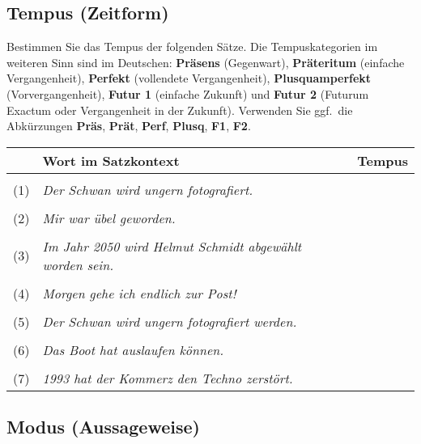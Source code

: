 \documentclass[12pt,a4paper,twoside]{article}
\newcommand{\gruen}[1]{\textcolor{gruen}{#1}}
\newcommand{\morphologieaufgabe}{}
\newcommand{\morphologieaufgabe}{\textbf{\gruen{Morphologie-Seminar}}\ |\ }
\begin{document}
\begin{ignorable}

\subsection{\morphologieaufgabe Tempus (Zeitform)}

Bestimmen Sie das Tempus der folgenden Sätze.
Die Tempuskategorien im weiteren Sinn sind im Deutschen: \textbf{Präsens} (Gegenwart), \textbf{Präteritum} (einfache Vergangenheit), \textbf{Perfekt} (vollendete Vergangenheit), \textbf{Plusquamperfekt} (Vorvergangenheit), \textbf{Futur 1} (einfache Zukunft) und \textbf{Futur 2} (Futurum Exactum oder Vergangenheit in der Zukunft).
Verwenden Sie ggf.\ die Abkürzungen \textbf{Präs}, \textbf{Prät}, \textbf{Perf}, \textbf{Plusq}, \textbf{F1}, \textbf{F2}.

\begin{center}
  \begin{tabular}[h]{clp{}}
    \toprule
    & \textbf{Wort im Satzkontext} & \textbf{Tempus} \\
    \midrule
    && \\
    (1) & \textit{Der Schwan wird ungern fotografiert.}                     &  \\ \cline{3-3}
    && \\
    (2) & \textit{Mir war übel geworden.}                                   &  \\ \cline{3-3}
    && \\
    (3) & \textit{Im  Jahr 2050 wird Helmut Schmidt abgewählt worden sein.} &  \\ \cline{3-3}
    && \\
    (4) & \textit{Morgen gehe ich endlich zur Post!}                        &  \\ \cline{3-3}
    && \\
    (5) & \textit{Der Schwan wird ungern fotografiert werden.}              &  \\ \cline{3-3}
    && \\
    (6) & \textit{Das Boot hat auslaufen können.}                           &  \\ \cline{3-3}
    && \\
    (7) & \textit{1993 hat der Kommerz den Techno zerstört.}                &  \\ \cline{3-3}
  \end{tabular}
\end{center}

\subsection{\morphologieaufgabe Modus (Aussageweise)}


\end{ignorable}
\end{document}
